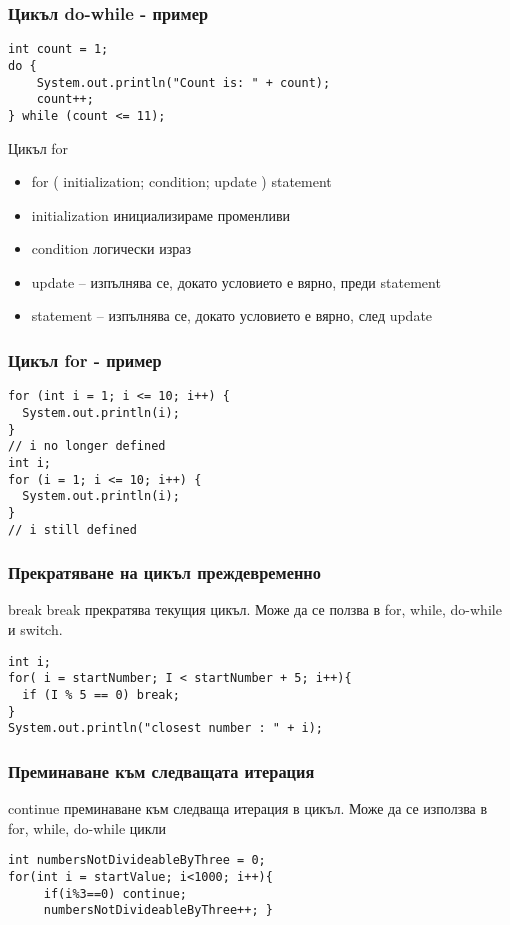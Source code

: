 \documentclass{beamer}
\begin{document}
\begin{frame}[fragile]
  \frametitle{Цикъл do-while - пример}
  \transdissolve
\begin{lstlisting}
int count = 1;
do {
    System.out.println("Count is: " + count);
    count++;
} while (count <= 11);
\end{lstlisting}
\end{frame}

\begin{frame}{Цикъл for}
  \transdissolve
  \begin{itemize}
  \item   for ( initialization; condition; update )  {statement}
    \item initialization инициализираме променливи
    \item condition логически израз
    \item update – изпълнява се, докато
    условието е вярно, преди statement

    \item statement – изпълнява се, докато
    условието е вярно, след update

  \end{itemize}
\end{frame}

\begin{frame}[fragile]
  \frametitle{Цикъл for - пример}
  \transdissolve
\begin{lstlisting}
for (int i = 1; i <= 10; i++) {
  System.out.println(i);
}
// i no longer defined
int i;
for (i = 1; i <= 10; i++) {
  System.out.println(i);
}
// i still defined
\end{lstlisting}
\end{frame}

\begin{frame}[fragile]
  \frametitle{Прекратяване на цикъл преждевременно}
  \transdissolve
  \transdissolve
  \begin{block}{break}
    break прекратява текущия цикъл. Може
    да се ползва в for, while, do-while и
    switch.
  \end{block}
\begin{lstlisting}
int i;
for( i = startNumber; I < startNumber + 5; i++){
  if (I % 5 == 0) break; 
}
System.out.println("closest number : " + i);
\end{lstlisting}
\end{frame}

\begin{frame}[fragile]
  \frametitle{Преминаване към следващата итерация}
  \transdissolve
  \transglitter[direction=90]
  \begin{block}{continue}
    преминаване към следваща
    итерация в цикъл. Може да се
    използва в for, while, do-while цикли
  \end{block}
\begin{lstlisting}
int numbersNotDivideableByThree = 0;
for(int i = startValue; i<1000; i++){
     if(i%3==0) continue;
     numbersNotDivideableByThree++; }
\end{lstlisting}
\end{frame}
\end{document}
